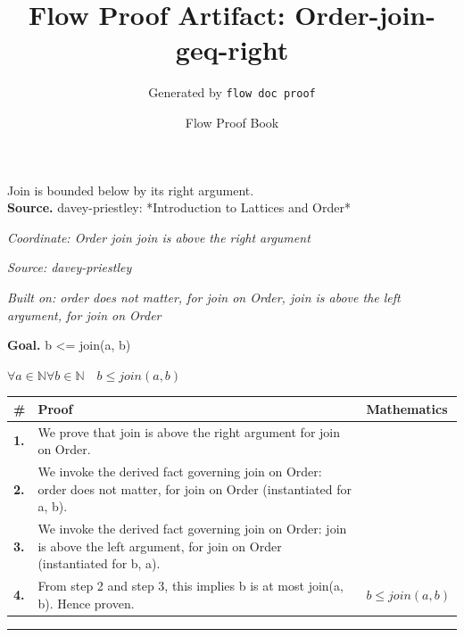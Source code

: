 \documentclass[11pt]{article}
\title{Flow Proof Artifact: Order-join-geq-right}
\author{Generated by \texttt{flow doc proof}}
\date{Flow Proof Book}
\theoremstyle{definition}
\begin{document}
\maketitle
Join is bounded below by its right argument.\\[0.5em]
\textbf{Source.} davey-priestley: *Introduction to Lattices and Order*\\[0.5em]
\bigskip
{}\par
\smallskip\noindent\textit{Coordinate: Order \cdot join \cdot join is above the right argument}\par
\smallskip\noindent\textit{Source: davey-priestley}\par
\smallskip\noindent\textit{Built on: order does not matter, for join on Order, join is above the left argument, for join on Order}\par
\medskip
\noindent\textbf{Goal.} b <= join(a, b)\par
\noindent$\displaystyle \forall a \in \mathbb{N} \forall b \in \mathbb{N}\quad b \le join(a, b)$\par
\medskip
\noindent
\begin{tabular}{@{} >{\raggedright\arraybackslash}p{} >{\raggedright\arraybackslash}p{} >{\raggedleft\arraybackslash}p{} @{}}
\textbf{\#} & \textbf{Proof} & \textbf{Mathematics} \\
\midrule
\textbf{1.} & We prove that join is above the right argument for join on Order. & \\[0.45em]
\textbf{2.} & We invoke the derived fact governing join on Order: order does not matter, for join on Order (instantiated for a, b). & \\[0.45em]
\textbf{3.} & We invoke the derived fact governing join on Order: join is above the left argument, for join on Order (instantiated for b, a). & \\[0.45em]
\textbf{4.} & From step 2 and step 3, this implies b is at most join(a, b). Hence proven. & $\displaystyle b \le join(a, b)$ \\[0.45em]
\bottomrule
\end{tabular}
\label{thm:Order-join-join_is_above_the_right_argument}
\par\medskip\hrule
\end{document}
